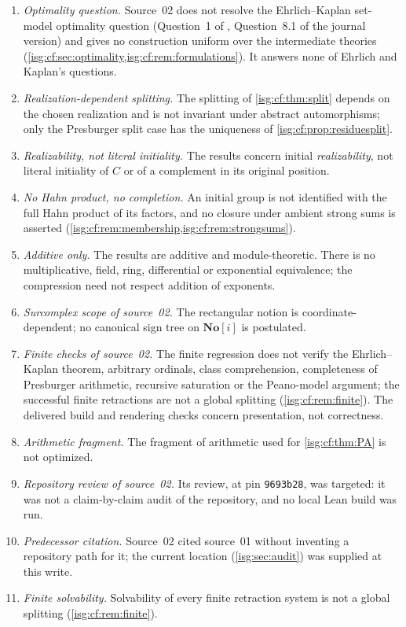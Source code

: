 \documentclass[11pt]{article}
\theoremstyle{definition}
\theoremstyle{remark}
\newcommand{\No}{\ensuremath{\mathbf{No}}}
\begin{document}
\begin{enumerate}[label=\textup{(N\arabic*)},leftmargin=*]
      sufficiency is not proved (\cref{isg:cf:sec:boundaries}).
\item \emph{Optimality question.} Source~02 does not resolve the
      Ehrlich--Kaplan set-model optimality question (Question~1 of
      \cite{EK}, Question~8.1 of the journal version) and gives no
      construction uniform over the intermediate theories
      (\cref{isg:cf:sec:optimality,isg:cf:rem:formulations}). It answers
      none of Ehrlich and Kaplan's questions.
\item \emph{Realization-dependent splitting.} The splitting of
      \cref{isg:cf:thm:split} depends on the chosen realization and is not
      invariant under abstract automorphisms; only the Presburger split
      case has the uniqueness of \cref{isg:cf:prop:residuesplit}.
\item \emph{Realizability, not literal initiality.} The results concern
      initial \emph{realizability}, not literal initiality of $C$ or of a
      complement in its original position.
\item \emph{No Hahn product, no completion.} An initial group is not
      identified with the full Hahn product of its factors, and no closure
      under ambient strong sums is asserted
      (\cref{isg:cf:rem:membership,isg:cf:rem:strongsums}).
\item \emph{Additive only.} The results are additive and
      module-theoretic. There is no multiplicative, field, ring,
      differential or exponential equivalence; the compression need not
      respect addition of exponents.
\item \emph{Surcomplex scope of source~02.} The rectangular notion is
      coordinate-dependent; no canonical sign tree on $\No[i]$ is
      postulated.
\item \emph{Finite checks of source~02.} The finite regression does not
      verify the Ehrlich--Kaplan theorem, arbitrary ordinals, class
      comprehension, completeness of Presburger arithmetic, recursive
      saturation or the Peano-model argument; the successful finite
      retractions are not a global splitting (\cref{isg:cf:rem:finite}).
      The delivered build and rendering checks concern presentation, not
      correctness.
\item \emph{Arithmetic fragment.} The fragment of arithmetic used for
      \cref{isg:cf:thm:PA} is not optimized.
\item \emph{Repository review of source~02.} Its review, at pin
      \texttt{9693b28}, was targeted: it was not a claim-by-claim audit
      of the repository, and no local Lean build was run.
\item \emph{Predecessor citation.} Source~02 cited source~01 without
      inventing a repository path for it; the current location
      (\cref{isg:sec:audit}) was supplied at this write.
\item \emph{Finite solvability.} Solvability of every finite retraction
      system is not a global splitting (\cref{isg:cf:rem:finite}).
\end{enumerate}
\end{document}
